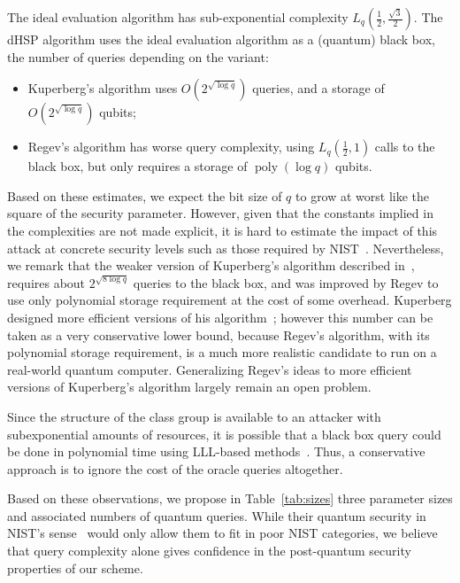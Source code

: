 \documentclass{llncs}
\DeclareMathOperator{\poly}{poly}
\begin{document}
The ideal evaluation algorithm has sub-exponential complexity
$L_q(\frac{1}{2},\frac{\sqrt{3}}{2})$.  The dHSP algorithm uses the
ideal evaluation algorithm as a (quantum) black box, the number of
queries depending on the variant:
\begin{itemize}
\item Kuperberg's algorithm uses $O(2^{\sqrt{\log q}})$ queries, and a
  storage of $O(2^{\sqrt{\log q}})$ qubits;
\item Regev's algorithm has worse query complexity, using
  $L_q(\frac{1}{2},1)$ calls to the black box, but only requires a
  storage of $\poly(\log q)$ qubits.
\end{itemize}

Based on these estimates, we expect the bit size of $q$ to grow at
worst like the square of the security parameter. However, given that
the constants implied in the complexities are not made explicit, it is
hard to estimate the impact of this attack at concrete security levels
such as those required by NIST~\cite{NIST2016}. Nevertheless, we
remark that the weaker version of Kuperberg's algorithm described
in~\cite[§2.1]{regev04}, requires about $2^{\sqrt{8\log q}}$ queries
to the black box, and was improved by Regev to use only polynomial
storage requirement at the cost of some overhead.
Kuperberg designed more efficient versions of his algorithm~\cite{todo};
however this number can be taken as a very conservative
lower bound,
because Regev's algorithm, with its polynomial
storage requirement, is a much more realistic candidate to run on a
real-world quantum computer. Generalizing Regev's ideas to more
efficient
versions of Kuperberg's algorithm largely remain an open problem.

Since the structure of the class group is available to an
attacker with subexponential amounts of resources, it is possible
that a black box query could be done in polynomial time using
LLL-based methods~\cite{todo}. Thus, a conservative approach is to
ignore the cost of the oracle queries altogether.

Based on these observations, we propose in
Table~\ref{tab:sizes} three parameter sizes and associated numbers
of quantum queries. While their quantum security in NIST's sense~\cite{NIST2016}
would only allow them to fit in poor NIST categories, we believe that query
complexity alone gives confidence in the post-quantum security properties
of our scheme.
\end{document}
